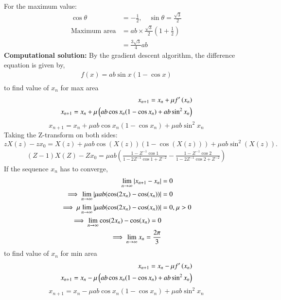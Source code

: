 \documentclass[journal]{IEEEtran}
\begin{document}
	For the maximum value:
	\begin{align}
		\cos\theta &= -\frac{1}{2}, \quad \sin\theta = \frac{\sqrt{3}}{2} \\
		\text{Maximum area} &= ab \times \frac{\sqrt{3}}{2} \left( 1 + \frac{1}{2} \right) \\
		&= \frac{3\sqrt{3}}{4} ab
	\end{align}
	\textbf{Computational solution:}
	\newline
	By the gradient descent algorithm, the difference equation is given by,
	\begin{align}
		f(x)=ab \sin{x} (1 - \cos{x})\\
	\end{align}
	to find value of $x_n$ for max area\\
	\begin{align}
		x_{n + 1} = x_n + \mu f^{\prime}\left(x_{n}\right)\\
		x_{n + 1} = x_n + \mu \left(ab \cos{x_{n}} (1 - \cos{x_{n}}) + ab \sin^2{x_{n}}\right)
	\end{align}
	\[
	x_{n+1} = x_n + \mu ab \cos x_n (1 - \cos x_n) + \mu ab \sin^2 x_n
	\]
	Taking the Z-transform on both sides:
	\[
	zX(z) - zx_0 = X(z) + \mu ab \cos(X(z))(1 - \cos(X(z))) + \mu ab \sin^2(X(z)).
	\]
	\begin{align}
		(Z-1)X(Z)-Zx_{0}={\mu}ab\left(\frac{1-Z^{-1}\cos{1}}{1-2Z^{-1}\cos{1}+Z^{-2}}-\frac{1-Z^{-1}\cos{2}}{1-2Z^{-1}\cos{2}+Z^{-2}}\right)
	\end{align}
	If the sequence $x_n$ has to converge,
	\begin{align}
		\lim_{n\to\infty} \left\vert x_{n + 1} - x_n\right\vert &= 0\\
		\implies \lim_{n\to\infty} \left\vert{\mu}ab(\cos(2x_{n})-\cos(x_{n}))\right\vert &= 0\\
		\implies \mu \lim_{n\to\infty} \left\vert{\mu}ab(\cos(2x_{n})-\cos(x_{n}))\right\vert &= 0 \text{, } \mu > 0\\
		\implies \lim_{n\to\infty} \cos(2x_{n})-\cos(x_{n}) = 0\\
		\implies \lim_{n\to\infty} x_{n} = \frac{2\pi}{3}
	\end{align}
	to find value of $x_n$ for min area\\
	\begin{align}
		x_{n + 1} = x_n - \mu f^{\prime}\left(x_{n}\right)\\
		x_{n + 1} = x_n - \mu \left(ab \cos{x_{n}} (1 - \cos{x_{n}}) + ab \sin^2{x_{n}}\right)
	\end{align}
	\[
	x_{n+1} = x_n - \mu ab \cos x_n (1 - \cos x_n) + \mu ab \sin^2 x_n
	\]
\end{document}
